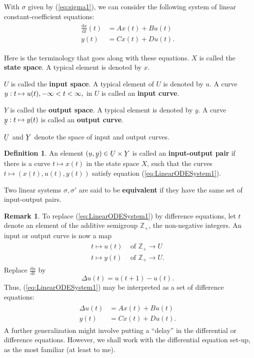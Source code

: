 \documentclass[12pt]{book}
\theoremstyle{plain}
\theoremstyle{definition}
\newtheorem{definition}{Definition}[section]
\newtheorem*{remark}{Remark}
\newcommand{\dd}[1]{\mathrm{d}#1}
\newcommand{\utilde}[1]{\underaccent{\tilde}{#1}}
\begin{document}
With $\sigma$ given by (\ref{eq:sigma1}), we can consider the following system of linear constant-coefficient equations:
\begin{align}
\begin{split} \label{eq:LinearODESystem1}
    \frac{\dd{x}}{\dd{t}}(t) &= Ax(t) + Bu(t) \\
    y(t) &= Cx(t) + Du(t).
\end{split}
\end{align}

Here is the terminology that goes along with these equations.
$X$ is called the \textbf{state space}.
A typical element is denoted by $x$.

$U$ is called the \textbf{input space}.
A typical element of $U$ is denoted by $u$.
A curve $\utilde{u}: t \mapsto u(t), -\infty < t < \infty,$ in $U$ is called an \textbf{input curve}.

$Y$ is called the \textbf{output space}.
A typical element is denoted by $y$.
A curve $\utilde{y}: t \mapsto y(t)$ is called an \textbf{output curve}.

$\utilde{U}$ and $\utilde{Y}$ denote the space of input and output curves.

\begin{definition}
    An element $(\utilde{u}, \utilde{y}) \in \utilde{U} \times \utilde{Y}$ is called an \textbf{input-output pair} if there is a curve $t \mapsto x(t)$ in the state space $X$, such that the curves $t \mapsto (x(t), u(t), y(t))$ satisfy equation (\ref{eq:LinearODESystem1}).
\end{definition}

Two linear systems $\sigma, \sigma'$ are said to be \textbf{equivalent} if they have the same set of input-output pairs.

\begin{remark}
    To replace (\ref{eq:LinearODESystem1}) by difference equations, let $t$ denote an element of the additive semigroup $\mathbb{Z}_+$, the non-negative integers.
    An input or output curve is now a map
    \begin{align*}
    \begin{split}
        t \mapsto u(t) &\text{ of } \mathbb{Z}_+ \to U \\
        t \mapsto y(t) &\text{ of } \mathbb{Z}_+ \to U.
    \end{split}
    \end{align*}
    Replace $\frac{\dd{u}}{\dd{t}}$ by
    $$\Delta u(t) = u(t + 1) - u(t).$$
    Thus, (\ref{eq:LinearODESystem1}) may be interpreted as a set of difference equations:
    \begin{align*}
    \begin{split}
        \Delta u(t) &= Ax(t) + Bu(t) \\
        y(t) &= Cx(t) + Du(t).
    \end{split}
    \end{align*}
    A further generalization might involve putting a ``delay'' in the differential or difference equations.
    However, we shall work with the differential equation set-up, as the most familiar (at least to me).
\end{remark}
\end{document}
